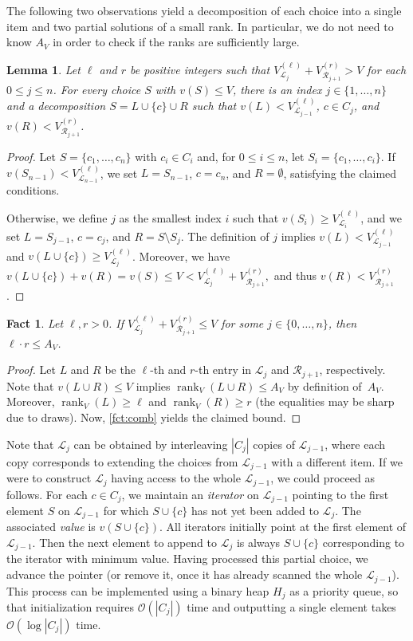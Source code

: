 \documentclass{article}
\theoremstyle{plain}
\newtheorem{lemma}[theorem]{Lemma}
\newtheorem{fact}[theorem]{Fact}
\theoremstyle{definition}
\newcommand{\Oh}{\mathcal{O}}
\renewcommand{\L}{\mathcal{L}}
\newcommand{\R}{\mathcal{R}}
\DeclareMathOperator*{\rank}{rank}
\begin{document}
The following two observations yield a decomposition of each choice into a single item and two partial solutions of a small rank.
  In particular, we do not need to know $A_V$ in order to check if the ranks are sufficiently large.
  
  \begin{lemma}\label{lem:decomp}
  Let $\ell$ and $r$ be positive integers such that $V^{(\ell)}_{\L_j}+V^{(r)}_{\R_{j+1}}> V$ for each $0\le j \le n$.
  For every choice $S$ with $v(S)\le V$, there is an index $j\in\{1,\ldots,n\}$ and a decomposition $S=L\cup\{c\}\cup R$
  such that $v(L) < V^{(\ell)}_{\L_{j-1}}$, $c\in C_j$, and $v(R) < V^{(r)}_{\R_{j+1}}$.
  \end{lemma}
  \begin{proof}
    Let $S=\{c_1,\ldots,c_n\}$ with $c_i\in C_i$ and, for $0\le i \le n$, let $S_i = \{c_1,\ldots,c_i\}$.
    If $v(S_{n-1})< V^{(\ell)}_{\L_{n-1}}$, we set $L=S_{n-1}$, $c=c_n$, and $R=\emptyset$, satisfying the claimed conditions.
    
    Otherwise, we define $j$ as the smallest index $i$ such that $v(S_i) \ge V^{(\ell)}_{\L_i}$,
    and we set $L=S_{j-1}$, $c=c_j$, and $R=S\setminus S_j$.
    The definition of $j$ implies $v(L)<V^{(\ell)}_{\L_{j-1}}$ and $v(L\cup\{c\})\ge V^{(\ell)}_{\L_j}$.
    Moreover, we have $v(L\cup \{c\})+v(R)=v(S)\le V < V^{(\ell)}_{\L_j}+V^{(r)}_{\R_{j+1}},$
    and thus $v(R) < V^{(r)}_{\R_{j+1}}$. \end{proof}
  
  \begin{fact}\label{fct:bound}
  Let $\ell,r>0$.
  If $V^{(\ell)}_{\L_j}+V^{(r)}_{\R_{j+1}}\le  V$ for some $j\in\{0,\ldots,n\}$, then $\ell \cdot r \le A_V$.
  \end{fact}
  \begin{proof}
  Let $L$ and $R$ be the $\ell$-th and $r$-th entry in $\L_j$ and $\R_{j+1}$, respectively.
  Note that $v(L\cup R)\le  V$ implies
  $\rank_V(L\cup R) \le A_V$ by definition of~$A_V$.
  Moreover, $\rank_V(L)\ge \ell$ and $\rank_V(R)\ge r$
  (the equalities may be sharp due to draws).
  Now, \cref{fct:comb} yields the claimed bound.
  \end{proof}

   Note that $\L_j$ can be obtained by interleaving $|C_j|$ copies of $\L_{j-1}$, where each copy corresponds
  to extending the choices from $\L_{j-1}$ with a different item.
  If we were to construct $\L_{j}$ having access to the whole $\L_{j-1}$, we could proceed as follows.
  For each $c\in C_j$, we maintain an \emph{iterator} on $\L_{j-1}$
  pointing to the first element $S$ on $\L_{j-1}$ for which $S\cup\{c\}$ has not yet been added to $\L_{j}$.
  The associated \emph{value} is $v(S\cup\{c\})$.
  All iterators initially point at the first element of $\L_{j-1}$. 
  Then the next element to append to $\L_j$ is always $S\cup\{c\}$ corresponding to the iterator with minimum value. 
  Having processed this partial choice, we advance the pointer (or remove it, once it has already scanned the whole $\L_{j-1}$).
  This process can be implemented using a binary heap $H_j$ as a priority queue,
  so that initialization requires $\Oh(|C_j|)$ time and outputting a single element takes $\Oh(\log |C_j|)$ time.
\end{document}
